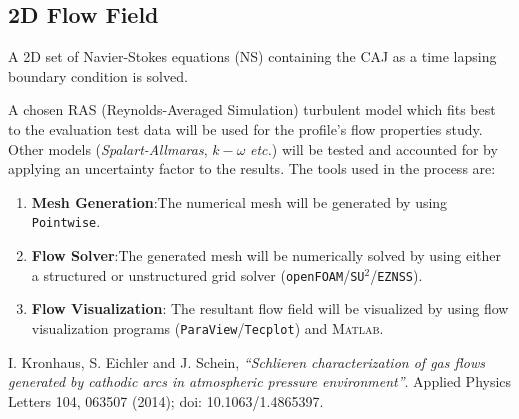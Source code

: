 \documentclass[10pt,a4paper]{article}
\begin{document}
\subsection{2D Flow Field}
A 2D set of Navier-Stokes equations (NS) containing the CAJ as a time lapsing boundary condition is solved.
\par A chosen RAS (Reynolds-Averaged Simulation) turbulent model which fits best to the evaluation test data will be used for the profile's flow properties study. Other models (\textit{Spalart-Allmaras}, $k-\omega$ \textit{etc.}) will be tested and accounted for by applying an uncertainty factor to the results. The tools used in the process are:
\begin{enumerate}
	\item \textbf{Mesh Generation}:\quad The numerical mesh will be generated by using \texttt{Pointwise}.
    \item \textbf{Flow Solver}:\quad The generated mesh will be numerically solved by using either a structured or unstructured grid solver (\texttt{openFOAM}/\texttt{SU$^2$}/\texttt{EZNSS}).
    \item \textbf{Flow Visualization}: The resultant flow field will be visualized by using flow visualization programs (\texttt{ParaView}/\texttt{Tecplot}) and \textsc{Matlab}.
\end{enumerate}

\begin{thebibliography}{99}

  I. Kronhaus, S. Eichler and J. Schein,
  \emph{``Schlieren characterization of gas flows generated by cathodic arcs in atmospheric pressure environment”}. Applied Physics Letters 104, 063507 (2014); doi: 10.1063/1.4865397.

\end{thebibliography}
\end{document}

